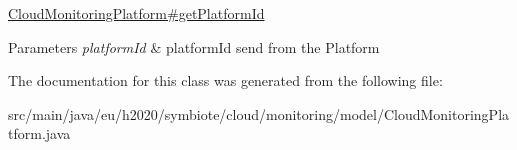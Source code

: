 \hyperlink{classeu_1_1h2020_1_1symbiote_1_1cloud_1_1monitoring_1_1model_1_1CloudMonitoringPlatform_a0e0c2ba8fc8fc2f1f3fc4d93120f8182}{Cloud\+Monitoring\+Platform\#get\+Platform\+Id} 
\begin{DoxyParams}{Parameters}
{\em platform\+Id} & platform\+Id send from the Platform \\
\hline
\end{DoxyParams}


The documentation for this class was generated from the following file\+:\begin{DoxyCompactItemize}
\item 
src/main/java/eu/h2020/symbiote/cloud/monitoring/model/Cloud\+Monitoring\+Platform.\+java\end{DoxyCompactItemize}
